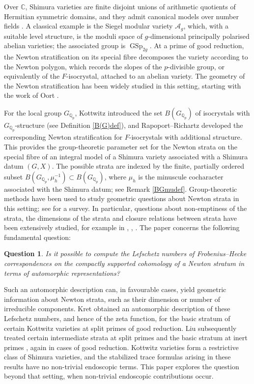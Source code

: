 \documentclass[11pt,a4paper]{article}
\theoremstyle{definition}
\theoremstyle{plain}
\theoremstyle{remark}
\theoremstyle{plain}
\newtheorem*{Q}{Question}
\DeclareMathOperator{\GSp}{GSp}
\begin{document}
Over $\mathbb{C}$, Shimura varieties are finite disjoint unions of arithmetic quotients of Hermitian symmetric domains, and they admit canonical models over number fields \cite{MR546620}. A classical example is the Siegel modular variety $\mathcal{A}_g$, which, with a suitable level structure, is the moduli space of $g$-dimensional principally polarised abelian varieties; the associated group is $\GSp_{2g}$. At a prime of good reduction, the Newton stratification on its special fibre decomposes the variety according to the Newton polygon, which records the slopes of the $p$-divisible group, or equivalently of the $F$-isocrystal, attached to an abelian variety. The geometry of the Newton stratification has been widely studied in this setting, starting with the work of Oort \cite{MR1722536}.

For the local group $G_{\mathbb{Q}_p}$, Kottwitz \cite{MR809866} introduced the set $B(G_{\mathbb{Q}_p})$ of isocrystals with $G_{\mathbb{Q}_p}$-structure (see Definition \ref{B(G)def}), and Rapoport--Richartz \cite{MR1411570} developed the corresponding Newton stratification for $F$-isocrystals with additional structure. This provides the group-theoretic parameter set for the Newton strata on the special fibre of an integral model of a Shimura variety associated with a Shimura datum $(G,X)$. The possible strata are indexed by the finite, partially ordered subset $B(G_{\mathbb{Q}_p},\mu_h^{-1})\subset B(G_{\mathbb{Q}_p})$, where $\mu_h$ is the minuscule cocharacter associated with the Shimura datum; see Remark \ref{BGmudef}. Group-theoretic methods have been used to study geometric questions about Newton strata in this setting; see \cite{MR4439210} for a survey. In particular, questions about non-emptiness
of the strata, the dimensions of the strata and closure relations between strata have been extensively studied, for
example in \cite{MR1781927}, \cite{MR3430453}, \cite{MR4484214}. The paper concerns the following fundamental question:

\begin{Q}
Is it possible to compute the Lefschetz numbers of Frobenius--Hecke correspondences on the compactly supported cohomology of a Newton stratum in terms of automorphic representations?
\end{Q}

Such an automorphic description can, in favourable cases, yield geometric information about Newton strata, such as their dimension or number of irreducible components. Kret \cite{MR3048605} obtained an automorphic description of these Lefschetz numbers, and hence of the zeta function, for the basic stratum of certain Kottwitz varieties at split primes of good reduction. Liu subsequently treated certain intermediate strata at split primes \cite{liu2025cohomologycertainintermediatestrata} and the basic stratum at inert primes \cite{liu2024automorphicdescriptionzetafunction}, again in cases of good reduction. Kottwitz varieties form a restrictive class of Shimura varieties, and the stabilized trace formulas arising in these results have no non-trivial endoscopic terms. This paper explores the question beyond that setting, when non-trivial endoscopic contributions occur.
\end{document}

